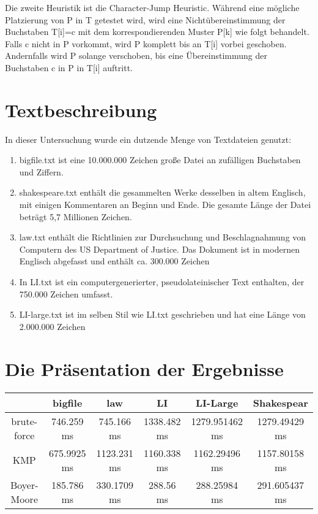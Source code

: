 \documentclass[14pt]{article}
\begin{document}
Die zweite Heuristik ist die Character-Jump Heuristic. Während eine mögliche Platzierung von P in T getestet wird, wird eine Nichtübereinstimmung der Buchstaben T[i]=c  mit dem korrespondierenden Muster P[k] wie folgt behandelt. Falls c nicht in P vorkommt, wird P komplett bis an T[i] vorbei geschoben. Andernfalls wird P solange verschoben, bis eine Übereinstimmung der Buchstaben c in P in T[i] auftritt.\\




\section{Textbeschreibung}
In dieser Untersuchung wurde ein dutzende Menge von Textdateien genutzt:\\

\begin{enumerate}
\item bigfile.txt ist eine 10.000.000 Zeichen große Datei an zufälligen Buchstaben und Ziffern.

\item shakespeare.txt enthält die gesammelten Werke desselben in altem Englisch, mit einigen Kommentaren an
 Beginn und Ende. Die gesamte Länge der Datei beträgt 5,7 Millionen Zeichen.
\item law.txt enthält die Richtlinien zur Durchsuchung und Beschlagnahmung von Computern des US Department of Justice. Das Dokument ist in modernen Englisch abgefasst und enthält ca. 300.000 Zeichen
\item In LI.txt ist ein computergenerierter,
 pseudolateinischer Text enthalten, der 750.000 Zeichen umfasst.
\item LI-large.txt ist im selben Stil wie LI.txt geschrieben und hat eine Länge von 2.000.000 Zeichen
\end{enumerate}

\section{Die Präsentation der Ergebnisse}
\begin{center}
\begin{tabular}{ |c|c|c|c|c|c| } 
 \hline
  & bigfile & law & LI & LI-Large & Shakespear \\
 \hline 
 brute-force & 746.259 ms & 745.166 ms & 1338.482 ms& 1279.951462 ms & 1279.49429 ms\\ 
 \hline
 KMP & 675.9925 ms & 1123.231 ms & 1160.338 ms & 1162.29496 ms & 1157.80158 ms\\ 
 \hline
 Boyer-Moore & 185.786 ms & 330.1709 ms & 288.56 ms & 288.25984 ms & 291.605437 ms\\ 
 \hline
\end{tabular}
\end{center}
\end{document}
